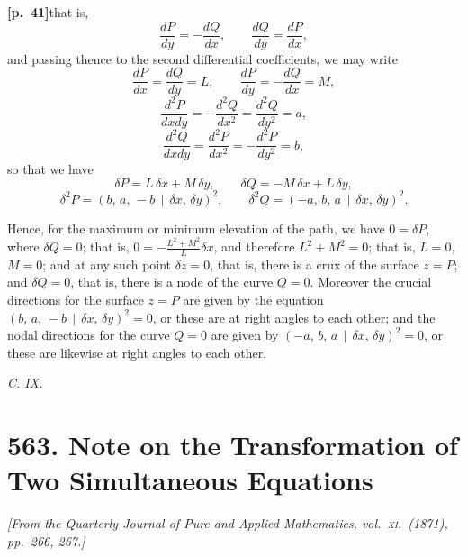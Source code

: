 \documentclass[11pt,a4paper]{article}
\begin{document}
\bigskip

\noindent\textbf{[p.~41]}\quad that is,
\[
\frac{dP}{dy} = -\frac{dQ}{dx},\qquad \frac{dQ}{dy} = \frac{dP}{dx},
\]
and passing thence to the second differential coefficients, we may write
\[
\frac{dP}{dx} = \frac{dQ}{dy} = L,\qquad \frac{dP}{dy} = -\frac{dQ}{dx} = M,
\]
\[
\frac{d^{2}P}{dxdy} = -\frac{d^{2}Q}{dx^{2}} = \frac{d^{2}Q}{dy^{2}} = a,
\]
\[
\frac{d^{2}Q}{dxdy} = \frac{d^{2}P}{dx^{2}} = -\frac{d^{2}P}{dy^{2}} = b,
\]
so that we have
\[
\delta P = L\,\delta x + M\,\delta y,\qquad \delta Q = -M\,\delta x + L\,\delta y,
\]
\[
\delta^{2}P = (b,\,a,\,-b\,\mid\, \delta x,\,\delta y)^{2},\qquad \delta^{2}Q = (-a,\,b,\,a\,\mid\,\delta x,\,\delta y)^{2}.
\]

Hence, for the maximum or minimum elevation of the path, we have $0 = \delta P$, where $\delta Q = 0$; that is, $0 = -\frac{L^{2} + M^{2}}{L}\delta x$, and therefore $L^{2} + M^{2} = 0$; that is, $L = 0$, $M = 0$; and at any such point $\delta z = 0$, that is, there is a crux of the surface $z = P$; and $\delta Q = 0$, that is, there is a node of the curve $Q = 0$. Moreover the crucial directions for the surface $z = P$ are given by the equation $(b,\,a,\,-b\,\mid\,\delta x,\,\delta y)^{2} = 0$, or these are at right angles to each other; and the nodal directions for the curve $Q = 0$ are given by $(-a,\,b,\,a\,\mid\,\delta x,\,\delta y)^{2} = 0$, or these are likewise at right angles to each other.

\bigskip

\begin{center}\textit{C. IX.}\end{center}

\bigskip

\section*{\textbf{563.} Note on the Transformation of Two Simultaneous Equations}

\noindent\textit{[From the Quarterly Journal of Pure and Applied Mathematics, vol.\ \textsc{xi}.\ (1871), pp.~266, 267.]}
\end{document}
